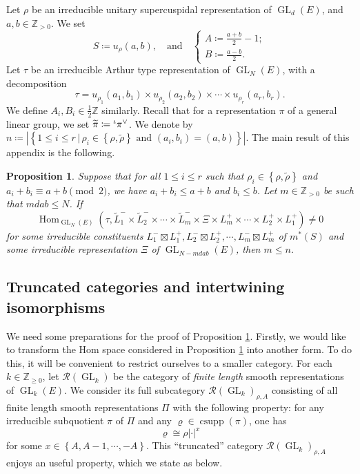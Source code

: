 \documentclass[11pt,letterpaper]{amsart}
\theoremstyle{plain}
\newcounter{theorem}[section]
\numberwithin{theorem}{section}
\numberwithin{equation}{subsection}
\newtheorem{Prop}[theorem]{Proposition}
\theoremstyle{remark}
\newcommand{\Hom}{\operatorname{Hom}}
\newcommand{\GL}{\operatorname{GL}}
\newcommand{\csupp}{\operatorname{csupp}} %
\newcommand{\Z}{\mathbb{Z}}
\def\calR{\mathcal{R}}
\begin{document}
Let $\rho$ be an irreducible unitary supercuspidal representation of $\GL_d\left(E\right)$, and $a,b\in\Z_{>0}$. We set
\[
    S\coloneqq u_\rho\left(a,b\right), \quad \text{and} \quad \begin{cases}
        A\coloneqq \frac{a+b}{2}-1;\\
        B\coloneqq \frac{a-b}{2}.
    \end{cases}
\]
Let $\tau$ be an irreducible Arthur type representation of $\GL_N\left(E\right)$, with a decomposition
\begin{equation}\label{E:DecompTauApp}
    \tau = u_{\rho_1}\left(a_1,b_1\right)\times u_{\rho_2}\left(a_2,b_2\right)\times\cdots\times u_{\rho_r}\left(a_r,b_r\right).
\end{equation}
We define $A_i,B_i\in\frac{1}{2}\Z$ similarly. Recall that for a representation $\pi$ of a general linear group, we set $\widetilde{\pi}\coloneqq \prescript{\iota}{}{\pi}^\vee$. We denote by $n\coloneqq \left|\left\{1\leq i\leq r\,\big|\,\rho_i\in\left\{\rho,\widetilde{\rho}\right\} \text{ and } \left(a_i,b_i\right)=\left(a,b\right)\right\}\right|$. The main result of this appendix is the following.

\begin{Prop}\label{P:TechnicalCountingMultiApp}
Suppose that for all $1\leq i\leq r$ such that $\rho_i\in\left\{\rho,\widetilde{\rho}\right\}$ and $a_i+b_i\equiv a+b \pmod2$, we have $a_i+b_i\leq a+b$ and $b_i\leq b$. Let $m\in\Z_{>0}$ be such that $mdab\leq N$. If
\[
    \Hom_{\GL_N\left(E\right)}\left(\tau, \widetilde{L}^-_1\times\widetilde{L}^-_2\times\cdots\times\widetilde{L}^-_m\times\Xi\times L^+_m\times\cdots\times L_2^+\times L_1^+\right)\neq 0
\]
for some irreducible constituents $L^-_1\boxtimes L^+_1, L^-_2\boxtimes L^+_2, \cdots, L^-_m\boxtimes L^+_m$ of $m^*\left(S\right)$ and some irreducible representation $\Xi$ of $\GL_{N-mdab}\left(E\right)$, then $m\leq n$.    
\end{Prop}

\vskip 5pt

\subsection{Truncated categories and intertwining isomorphisms} %
\label{sub:truncated_category_of_finite_length_representations}

We need some preparations for the proof of Proposition \ref{P:TechnicalCountingMultiApp}. Firstly, we would like to transform the Hom space considered in Proposition \ref{P:TechnicalCountingMultiApp} into another form. To do this, it will be convenient to restrict ourselves to a smaller category. For each $k\in\Z_{\geq 0}$, let $\calR\left(\GL_k\right)$ be the category of \emph{finite length} smooth representations of $\GL_k\left(E\right)$. We consider its full subcategory $\calR\left(\GL_k\right)_{\rho,A}$ consisting of all finite length smooth representations $\Pi$ with the following property: for any irreducible subquotient $\pi$ of $\Pi$ and any $\varrho\in\csupp\left(\pi\right)$, one has
\[
    \varrho\cong\rho|\cdot|^{x}
\]
for some $x\in\left\{A,A-1,\cdots,-A\right\}$. This ``truncated'' category $\calR\left(\GL_k\right)_{\rho,A}$ enjoys an useful property, which we state as below.
\end{document}
